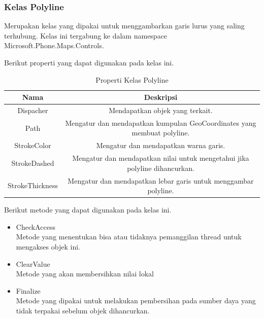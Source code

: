\subsubsection{Kelas Polyline}
\label{subsubsec:Kelas Polyline}
\hspace{0.5cm} Merupakan kelas yang dipakai untuk menggambarkan garis lurus yang saling terhubung. Kelas ini tergabung ke dalam namespace  Microsoft.Phone.Maps.Controls. 

Berikut properti yang dapat digunakan pada kelas ini.
\begin{table}[h]
	\centering
		\begin{tabular}{ |c||c|}
				\hline
					Nama & Deskripsi \\ \hline
					Dispacher & Mendapatkan objek yang terkait. \\ \hline
					Path & Mengatur dan mendapatkan kumpulan GeoCoordinates yang membuat polyline. \\ \hline
					StrokeColor & Mengatur dan mendapatkan warna garis. \\ \hline
					StrokeDashed & Mengatur dan mendapatkan nilai untuk mengetahui jika polyline dihancurkan. \\ \hline
					StrokeThickness & Mengatur dan mendapatkan lebar garis untuk menggambar polyline. \\ \hline
				\hline
		\end{tabular}
	\caption{Properti Kelas Polyline}
	\label{tab:PropertiKelasPolyline}
\end{table}

Berikut metode yang dapat digunakan pada kelas ini.
\begin{itemize}
	\item CheckAccess\\
	Metode yang menentukan bisa atau tidaknya pemanggilan thread untuk mengakses objek ini.
	\item ClearValue\\
	Metode yang akan membersihkan nilai lokal
	\item Finalize \\
	Metode yang dipakai untuk melakukan pembersihan pada sumber daya yang tidak terpakai sebelum objek dihancurkan.
\end{itemize}

